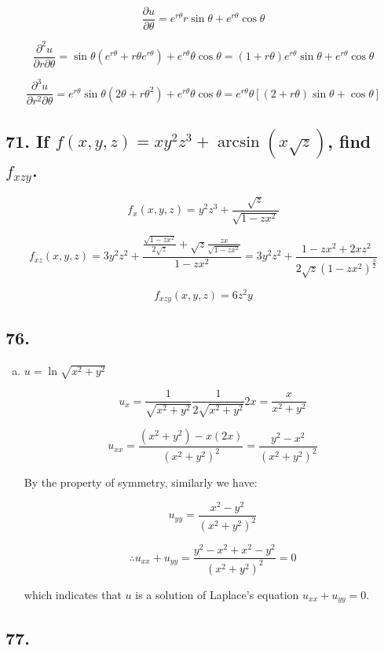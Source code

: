 \documentclass{article}
\begin{document}
    $$\frac{\partial u}{\partial \theta} = e^{r\theta} r \sin \theta + e^{r\theta} \cos \theta$$

    $$\frac{\partial^2 u}{\partial r \partial \theta} = \sin \theta (e^{r\theta} + r\theta e^{r\theta} ) + e^{r\theta} \theta \cos \theta = (1+r\theta) e^{r\theta} \sin \theta + e^{r\theta}\cos \theta$$

    $$\frac{\partial^3 u}{\partial r^2 \partial \theta} = e^{r\theta} \sin \theta (2\theta +r\theta^2) + e^{r\theta}\theta \cos \theta = e^{r\theta}\theta[(2+r\theta)\sin \theta + \cos \theta]$$

    \subsection*{71. If $f(x, y, z) = xy^2z^3 + \arcsin(x\sqrt z)$, find $f_{xzy}$.}

    $$f_x(x, y, z) = y^2z^3 + \frac{\sqrt z}{\sqrt{1-zx^2}}$$

    $$f_{xz}(x, y, z) = 3y^2z^2 + \frac{\frac{\sqrt{1-zx^2}}{2\sqrt z} + \sqrt{z} \frac{zx}{\sqrt{1-zx^2}}}{1 - zx^2} = 3y^2z^2 + \frac{1-zx^2 + 2xz^2}{2\sqrt z (1-zx^2)^{\frac 3 2}}$$

    $$f_{xzy}(x, y, z) = 6z^2y$$

    \subsection*{76.}

    \begin{enumerate}[(d)]
        \item $u = \ln\sqrt{x^2 + y^2}$

        $$u_x = \frac{1}{\sqrt{x^2 + y^2}} \frac{1}{2\sqrt{x^2 + y^2}} 2x = \frac{x}{x^2 + y^2}$$

        $$u_{xx} = \frac{(x^2 + y^2) - x (2x)}{(x^2 + y^2)^2} = \frac{y^2 - x^2}{(x^2 + y^2)^2}$$

        By the property of symmetry, similarly we have:

        $$u_{yy} = \frac{x^2 - y^2}{(x^2 + y^2)^2}$$

        $$\therefore u_{xx} + u_{yy} = \frac{y^2 - x^2 + x^2 - y^2}{(x^2 + y^2)^2} = 0$$

        which indicates that $u$ is a solution of Laplace's equation $u_{xx} + u_{yy} = 0$.
    \end{enumerate}

    \subsection*{77. }
\end{document}
